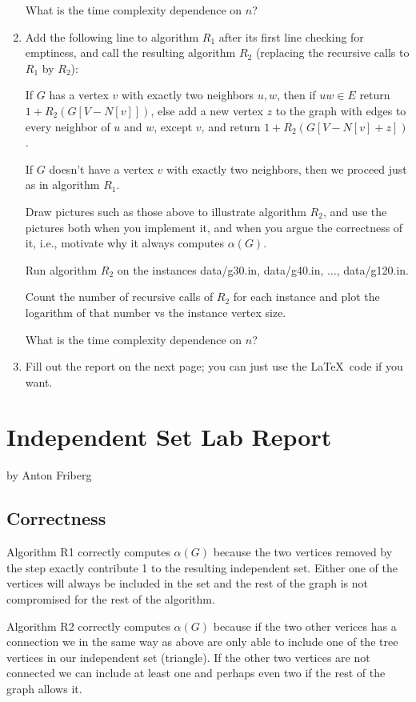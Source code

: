 \documentclass{tufte-handout}
\begin{document}
\begin{enumerate}
  What is the time complexity dependence on $n$?

\item Add the following line to algorithm $R_1$ after its first line
  checking for emptiness, and call the resulting algorithm $R_2$
  (replacing the recursive calls to $R_1$ by $R_2$):
 
  If $G$ has a vertex $v$ with exactly two neighbors $u,w$, then if
  $uw\in E$ return $1+R_2(G[V-N[v]])$, else add a new vertex $z$ to
  the graph with edges to every neighbor of $u$ and $w$, except $v$,
  and return $1+R_2(G[V-N[v]+z])$.

  If $G$ doesn't have a vertex $v$ with exactly two neighbors, then we
  proceed just as in algorithm $R_1$.
 
  Draw pictures such as those above to illustrate algorithm $R_2$, and
  use the pictures both when you implement it, and when you argue the
  correctness of it, i.e., motivate why it always computes
  $\alpha(G)$.
 
  Run algorithm $R_2$ on the instances data/g30.in, data/g40.in,
  $\ldots$, data/g120.in.

  Count the number of recursive calls of $R_2$ for each instance and plot the
  logarithm of that number vs the instance vertex size. 
  
  What is the time complexity dependence on $n$?

\item Fill out the report on the next page; you can just use the
  \LaTeX\ code if you want.
\end{enumerate}

\newpage


\newpage
\section{Independent Set Lab Report}


by Anton Friberg

\subsection{Correctness}
Algorithm R1 correctly computes $\alpha(G)$ because the two vertices removed by the step exactly contribute 1 to the
resulting independent set. Either one of the vertices will always be included in the set and the rest of the graph is
not compromised for the rest of the algorithm.

\noindent
Algorithm R2 correctly computes $\alpha(G)$ because if the two other verices has a connection we in the same way as
above are only able to include one of the tree vertices in our independent set (triangle). If the other two vertices are
not connected we can include at least one and perhaps even two if the rest of the graph allows it.
\end{document}

